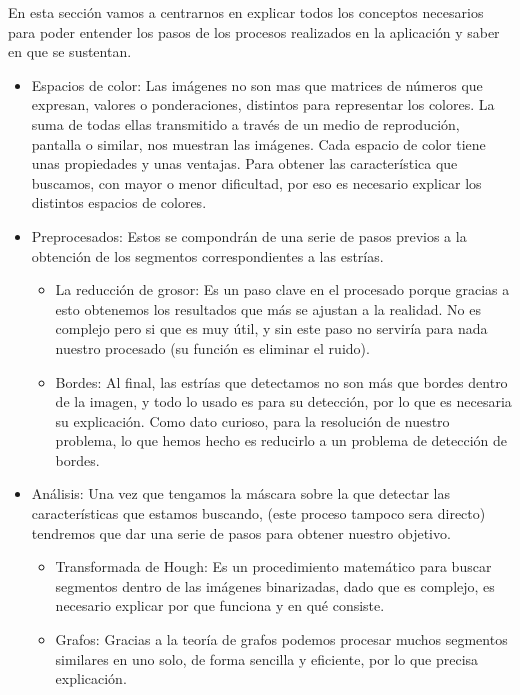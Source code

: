 En esta sección vamos a centrarnos en explicar todos los conceptos necesarios para poder entender los pasos de los procesos realizados en la aplicación y saber en que se sustentan.

\begin{itemize}
\item Espacios de color: Las imágenes no son mas que matrices de números que expresan, valores o ponderaciones, distintos para representar los colores. La suma de todas ellas transmitido a través de un medio de reprodución, pantalla o similar, nos muestran las imágenes.
Cada espacio de color tiene unas propiedades y unas ventajas. Para obtener las característica que buscamos, con mayor o menor dificultad, por eso es necesario explicar los distintos espacios de colores.

\item Preprocesados:
Estos se compondrán de una serie de pasos previos a la obtención de los segmentos correspondientes a las estrías.
	\begin{itemize}
		\item La reducción de grosor: Es un paso clave en el procesado porque gracias a esto obtenemos los resultados que más se ajustan a la realidad.
No es complejo pero si que es muy útil, y sin este paso no serviría para nada nuestro procesado (su función es eliminar el ruido).
		\item Bordes: Al final, las estrías que detectamos no son más que bordes dentro de la imagen, y todo lo usado es para su detección, por lo que es necesaria su explicación. Como dato curioso, para la resolución de nuestro problema, lo que hemos hecho es reducirlo a un problema de detección de bordes.
	\end{itemize}

\item Análisis: 
Una vez que tengamos la máscara sobre la que detectar las características que estamos buscando, (este proceso tampoco sera directo) tendremos que dar  una serie de pasos para obtener nuestro objetivo.
	\begin{itemize}
	\item Transformada de Hough: Es un procedimiento matemático para buscar segmentos dentro de las imágenes binarizadas, dado que es complejo, es necesario explicar por que funciona y en qué consiste.

	\item Grafos: Gracias a la teoría de grafos podemos procesar muchos segmentos similares en uno solo, de forma sencilla y eficiente, por lo que precisa explicación.
	\end{itemize}

\end{itemize}



